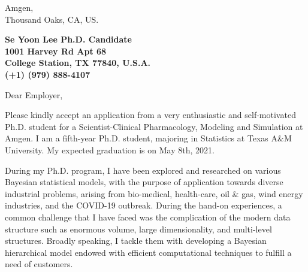 \documentclass[9pt]{letter} %
\begin{document}

\begin{letter}{
Amgen,\\
Thousand Oaks, CA, US.} 


\begin{center}
\large\bf Se Yoon Lee Ph.D. Candidate\\ %
1001 Harvey Rd Apt 68
 \\ College Station, TX 77840, U.S.A.\\(+1) (979) 888-4107%
\end{center} 
\vfill

\signature{Se Yoon Lee} %


\opening{Dear Employer,} 
Please kindly accept an application from a very enthusiastic and self-motivated Ph.D. student for a Scientist-Clinical Pharmacology, Modeling and Simulation at Amgen. I am a fifth-year Ph.D. student, majoring in Statistics at Texas A\&M University. My expected graduation is on May 8th, 2021.

During my Ph.D. program, I have been explored and researched on various Bayesian statistical models, with the purpose of application towards diverse industrial problems, arising from bio-medical, health-care, oil \& gas, wind energy industries, and the COVID-19 outbreak. During the hand-on experiences, a common challenge that I have faced was the complication of the modern data structure such as enormous volume, large dimensionality, and multi-level structures. Broadly speaking, I tackle them with developing a Bayesian hierarchical model endowed with efficient computational techniques to fulfill a need of customers. 


\end{letter}
\end{document}
